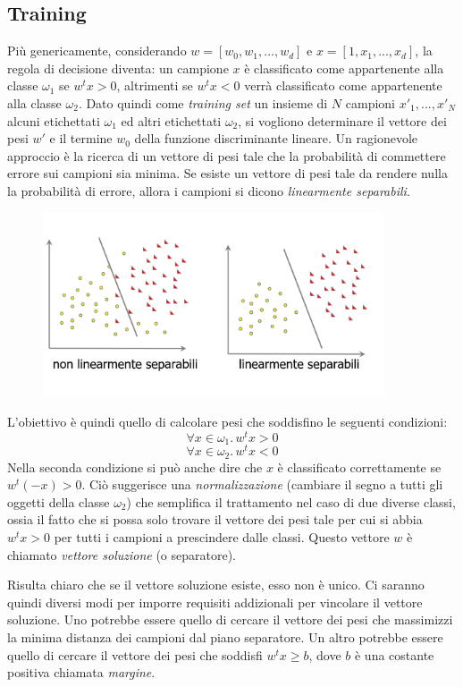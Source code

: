 \documentclass[a4paper,oneside,titlepage]{book}
\begin{document}
\subsection{Training}
Più genericamente, considerando $w=[w_0,w_1,...,w_d]$ e $x=[1,x_1,...,x_d]$, la regola di decisione diventa: un campione $x$ è classificato come appartenente alla classe $\omega_1$ se $w^t x > 0$, altrimenti se $w^t x < 0$ verrà classificato come appartenente alla classe $\omega_2$. Dato quindi come \textit{training set} un insieme di $N$ campioni $x'_1,...,x'_N$ alcuni etichettati $\omega_1$ ed altri etichettati $\omega_2$, si vogliono determinare il vettore dei pesi $w'$ e il termine $w_0$ della funzione discriminante lineare. Un ragionevole approccio è la ricerca di un vettore di pesi tale che la probabilità di commettere errore sui campioni sia minima. Se esiste un vettore di pesi tale da rendere nulla la probabilità di errore, allora i campioni si dicono \textit{linearmente separabili}.
\begin{figure}[htp]
	\centering
	\includegraphics[width=0.9\textwidth]{svm2.png}
\end{figure}

\noindent
L'obiettivo è quindi quello di calcolare pesi che soddisfino le seguenti condizioni:
\[ \forall x \in \omega_1. \, w^t x > 0 \]
\[ \forall x \in \omega_2. \, w^t x < 0 \]
Nella seconda condizione si può anche dire che $x$ è classificato correttamente se $w^t (-x) > 0$. Ciò suggerisce una \textit{normalizzazione} (cambiare il segno a tutti gli oggetti della classe $\omega_2$) che semplifica il trattamento nel caso di due diverse classi, ossia il fatto che si possa solo trovare il vettore dei pesi tale per cui si abbia $w^t x > 0$ per tutti i campioni a prescindere dalle classi. Questo vettore $w$ è chiamato \textit{vettore soluzione} (o separatore).

Risulta chiaro che se il vettore soluzione esiste, esso non è unico. Ci saranno quindi diversi modi per imporre requisiti addizionali per vincolare il vettore soluzione. Uno potrebbe essere quello di cercare il vettore dei pesi che massimizzi la minima distanza dei campioni dal piano separatore. Un altro potrebbe essere quello di cercare il vettore dei pesi che soddisfi $w^t x \geq b$, dove $b$ è una costante positiva chiamata \textit{margine}. 
\end{document}
